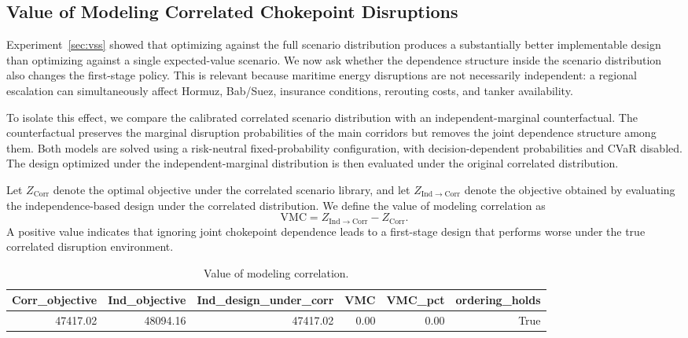 \documentclass[final,3p,authoryear]{elsarticle}
\theoremstyle{definition}
\begin{document}
\subsection{Value of Modeling Correlated Chokepoint Disruptions}
\label{sec:vmc}
 
Experiment~\ref{sec:vss} showed that optimizing against the full
scenario distribution produces a substantially better implementable
design than optimizing against a single expected-value scenario. We now
ask whether the dependence structure inside the scenario distribution
also changes the first-stage policy. This is relevant because maritime
energy disruptions are not necessarily independent: a regional
escalation can simultaneously affect Hormuz, Bab/Suez, insurance
conditions, rerouting costs, and tanker availability.
 
To isolate this effect, we compare the calibrated correlated scenario
distribution with an independent-marginal counterfactual. The
counterfactual preserves the marginal disruption probabilities of the
main corridors but removes the joint dependence structure among them.
Both models are solved using a risk-neutral fixed-probability
configuration, with decision-dependent probabilities and CVaR disabled.
The design optimized under the independent-marginal distribution is
then evaluated under the original correlated distribution.
 
Let \(Z_{\mathrm{Corr}}\) denote the optimal objective under the
correlated scenario library, and let \(Z_{\mathrm{Ind}\rightarrow
\mathrm{Corr}}\) denote the objective obtained by evaluating the
independence-based design under the correlated distribution. We define
the value of modeling correlation as
\[
\mathrm{VMC}
=
Z_{\mathrm{Ind}\rightarrow\mathrm{Corr}}
-
Z_{\mathrm{Corr}}.
\]
A positive value indicates that ignoring joint chokepoint dependence
leads to a first-stage design that performs worse under the true
correlated disruption environment.
 
\begin{table}
\caption{Value of modeling correlation.}
\label{tab:tab03_vmc}
\begin{tabular}{rrrrrr}
\toprule
Corr\_objective & Ind\_objective & Ind\_design\_under\_corr & VMC & VMC\_pct & ordering\_holds \\
\midrule
47417.02 & 48094.16 & 47417.02 & 0.00 & 0.00 & True \\
\bottomrule
\end{tabular}
\end{table}
\end{document}
